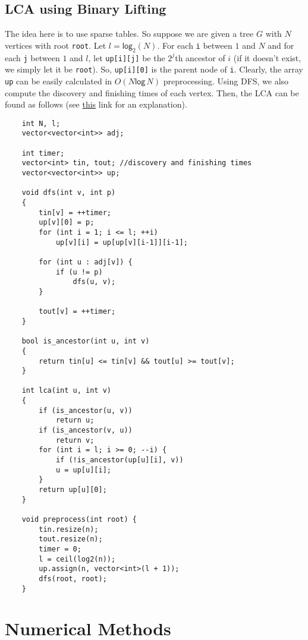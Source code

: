 \documentclass[12pt,a4paper]{amsart}
\numberwithin{equation}{section}
\theoremstyle{definition}
\begin{document}
\subsection{LCA using Binary Lifting} The idea here is to use sparse tables. So suppose we are given a tree $G$ with $N$ vertices with root \verb|root|. Let $l = \mathsf{log}_2(N)$. For each \verb|i| between $1$ and $N$ and for each \verb|j| between $1$ and $l$, let \verb|up[i][j]| be the $2^{j}$th ancestor of $i$ (if it doesn't exist, we simply let it be \verb|root|). So, \verb|up[i][0]| is the parent node of \verb|i|. Clearly, the array \verb|up| can be easily calculated in $O(N\mathsf{log\,}N)$ preprocessing. Using DFS, we also compute the discovery and finishing times of each vertex. Then, the LCA can be found as follows (see \href{https://cp-algorithms.com/graph/lca_binary_lifting.html}{this} link for an explanation).

\begin{lstlisting}
    int N, l;
    vector<vector<int>> adj;

    int timer;
    vector<int> tin, tout; //discovery and finishing times
    vector<vector<int>> up;

    void dfs(int v, int p)
    {
        tin[v] = ++timer;
        up[v][0] = p; 
        for (int i = 1; i <= l; ++i)
            up[v][i] = up[up[v][i-1]][i-1];

        for (int u : adj[v]) {
            if (u != p)
                dfs(u, v);
        }

        tout[v] = ++timer;
    }

    bool is_ancestor(int u, int v)
    {
        return tin[u] <= tin[v] && tout[u] >= tout[v];
    }

    int lca(int u, int v)
    {
        if (is_ancestor(u, v))
            return u;
        if (is_ancestor(v, u))
            return v;
        for (int i = l; i >= 0; --i) {
            if (!is_ancestor(up[u][i], v))
            u = up[u][i];
        }
        return up[u][0];
    }

    void preprocess(int root) {
        tin.resize(n);
        tout.resize(n);
        timer = 0;
        l = ceil(log2(n));
        up.assign(n, vector<int>(l + 1));
        dfs(root, root);
    }
\end{lstlisting}

\section{Numerical Methods}
\end{document}
